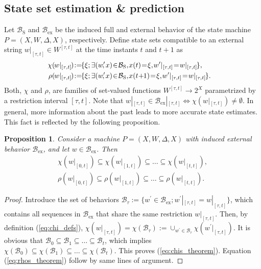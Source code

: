 \documentclass[a4paper, 10pt, conference]{ieeeconf}
\newtheorem{proposition}{Proposition}
\newcommand{\hspm}{\hspace{-2pt}}
\newcommand{\hspu}{\hspace{-1pt}}
\newcommand{\bex}{\mathcal{B}_{{\textrm{ex}}}}
\newcommand{\taut}{{_{[\tau,t]}}}
\newcommand{\tautn}{{{[\tau,t]}}}
\begin{document}
\subsection{State set estimation \& prediction}
\label{sec:monolithic_setvaluedset}
Let $\mathcal{B}_\text{S}$ and $\mathcal{B}_\textrm{ex}$ be the induced full and external behavior of the state machine $P=(X,W,\Delta,X)$, respectively. Define state sets compatible to an external string $w|_{[\tau,t]}\in W^{\tautn}$ at the time instants $t$ and $t+1$ as
\begin{subequations}
\begin{align}
\label{eq:chi_defs}
\hspm\hspm\hspm\hspm\hspm\chi(\hspu w|_{[\tau,t]}\hspu)\hspm:=&\hspu\{\xi;\exists (w^\prime\hspm\hspm,x)\hspm\in\hspm\mathcal{B}_\text{S},\hspu x(t)\hspm=\hspm\xi,\hspu w^\prime|_{[\tau,t]}\hspm=\hspm w|_{[\tau,t]}\hspu\}, \\
\label{eq:rho_defs}
\hspm\hspm\hspm\hspm\hspm\rho(\hspu w|_{[\tau,t]}\hspu)\hspm:=&\hspu\{\xi;\exists (w^\prime\hspm\hspm,x)\hspm\in\hspm\mathcal{B}_\text{S},\hspu x({t\hspm+\hspu\hspm1})\hspm=\hspm\xi,\hspu w^\prime|_{[\tau,t]}\hspm=\hspm w|_{[\tau,t]}\hspu\}.
\end{align}
\end{subequations}
Both, $\chi$ and $\rho$, are families of set-valued functions $W^{\tautn}\to 2^X$ parametrized by a restriction interval $[\tau,t]$. Note that $w|\taut\in\bex|\taut\Leftrightarrow \chi(w|\taut)\neq\emptyset$. In general, more information about the past leads to more accurate state estimates. This fact is reflected by the following proposition.
\begin{proposition}\label{thm:main_1}
Consider a machine $P=(X,W,\Delta,X)$ with induced external behavior $\mathcal{B}_{\text{ex}}$, and let $w\in \mathcal{B}_\textrm{ex}$. Then
\vspace{-4pt}
\begin{subequations}
\begin{align}
\label{eq:chis_theorem}
\chi(w|_{[0,t]}) \subseteq \chi(w|_{[1,t]})\subseteq \ldots \subseteq \chi(w|_{[t,t]}),\\
\label{eq:rhos_theorem}
\rho(w|_{[0,t]})\subseteq \rho(w|_{[1,t]})\subseteq \ldots \subseteq \rho(w|_{[t,t]}).
\end{align}
\end{subequations}
\end{proposition}
\begin{proof}
Introduce the set of behaviors $\mathcal{B}_{\tau} := \{w^\prime \in \mathcal{B}_{\text{ex}}; {w}^\prime|_{[\tau,t]}=w|_{[\tau,t]}\}$, which contains all sequences in $\mathcal{B}_\textrm{ex}$ that share the same restriction $w|_{[\tau,t]}$. Then, by definition (\ref{eq:chi_defs}), $\chi(w|_{[\tau,t]})=\chi(\mathcal{B}_{\tau}):=\cup_{w^\prime\in\mathcal{B}_{\tau}}\chi(w^\prime|_{[\tau,t]})$. It is obvious that $
\mathcal{B}_{0} \subseteq \mathcal{B}_{1} \subseteq \ldots \subseteq \mathcal{B}_{t}$, which implies $\chi(\mathcal{B}_{0}) \subseteq \chi(\mathcal{B}_{1}) \subseteq \ldots \subseteq \chi(\mathcal{B}_{t})$. This proves (\ref{eq:chis_theorem}). Equation (\ref{eq:rhos_theorem}) follow by same lines of argument.
\end{proof}
\end{document}
